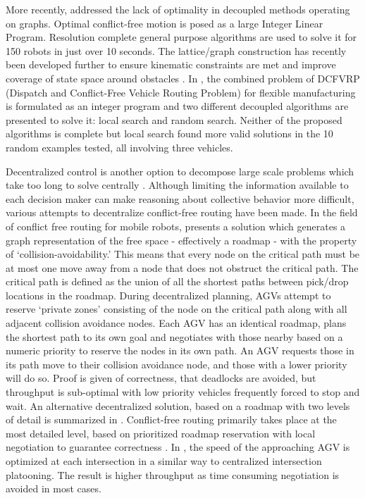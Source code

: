 More recently, \cite{Yu2013} addressed the lack of optimality in decoupled methods operating on graphs. Optimal conflict-free motion is posed as a large Integer Linear Program. Resolution complete general purpose algorithms are used to solve it for 150 robots in just over 10 seconds. The lattice/graph construction has recently been developed further to ensure kinematic constraints are met and improve coverage of state space around obstacles \cite{Yu2018}. In \cite{Miyamoto2016}, the combined problem of DCFVRP (Dispatch and Conflict-Free Vehicle Routing Problem) for flexible manufacturing is formulated as an integer program and two different decoupled algorithms are presented to solve it: local search and random search. Neither of the proposed algorithms is complete but local search found more valid solutions in the 10 random examples tested, all involving three vehicles.

Decentralized control is another option to decompose large scale problems which take too long to solve centrally \cite{Bakule2008}. Although limiting the information available to each decision maker can make reasoning about collective behavior more difficult, various attempts to decentralize conflict-free routing have been made. 
In the field of conflict free routing for mobile robots, \cite{Draganjac2016} presents a solution which generates a graph representation of the free space - effectively a roadmap - with the property of `collision-avoidability.' This means that every node on the critical path must be at most one move away from a node that does not obstruct the critical path. The critical path is defined as the union of all the shortest paths between pick/drop locations in the roadmap. During decentralized planning, AGVs attempt to reserve `private zones' consisting of the node on the critical path along with all adjacent collision avoidance nodes. Each AGV has an identical roadmap, plans the shortest path to its own goal and negotiates with those nearby based on a numeric priority to reserve the nodes in its own path. An AGV requests those in its path move to their collision avoidance node, and those with a lower priority will do so. Proof is given of correctness, that deadlocks are avoided, but throughput is sub-optimal with low priority vehicles frequently forced to stop and wait. %
An alternative decentralized solution, based on a roadmap with two levels of detail is summarized in \cite{Sabattini2018}. Conflict-free routing primarily takes place at the most detailed level, based on prioritized roadmap reservation with local negotiation to guarantee correctness \cite{Digani2014}.  In \cite{Digani2019}, the speed of the approaching AGV is optimized at each intersection in a similar way to centralized intersection platooning. The result is higher throughput as time consuming negotiation is avoided in most cases.      

